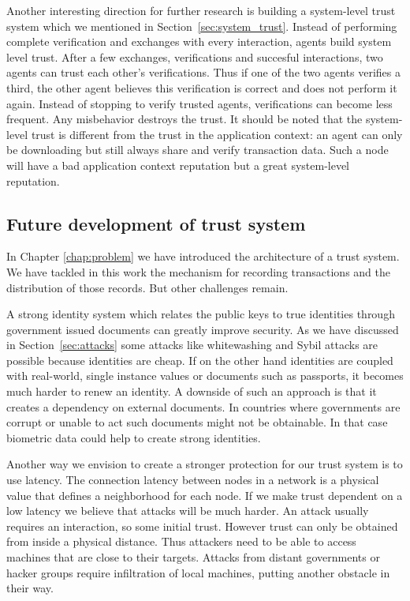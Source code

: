 Another interesting direction for further research is building a system-level trust system which we
mentioned in Section~\ref{sec:system_trust}. Instead of performing complete verification and exchanges
with every interaction, agents build system level trust. After a few exchanges, verifications and 
succesful interactions, two agents can trust each other's verifications. Thus if one of the two 
agents verifies a third, the other agent believes this verification is correct and does not perform
it again. Instead of stopping to verify trusted agents, verifications can become less frequent. Any 
misbehavior destroys the trust. It should be noted that the system-level trust is different from the
trust in the application context: an agent can only be downloading but still always share and verify
transaction data. Such a node will have a bad application context reputation but a great system-level
reputation.

\subsection{Future development of trust system}
In Chapter \ref{chap:problem} we have introduced the architecture of a trust system. We have tackled
in this work the mechanism for recording transactions and the distribution of those records. But
other challenges remain. 

A strong identity system which relates the public keys to true identities through government issued
documents can greatly improve security. As we have discussed in Section~\ref{sec:attacks} some 
attacks like whitewashing and Sybil attacks are possible because identities are cheap. If on the 
other hand identities are coupled with real-world, single instance values or documents such as 
passports, it becomes much harder to renew an identity. A downside of such an approach is that 
it creates a dependency on external documents. In countries where governments are corrupt or 
unable to act such documents might not be obtainable. In that case biometric data could help to 
create strong identities. 

Another way we envision to create a stronger protection for our trust system is to use latency. The 
connection latency between nodes in a network is a physical value that defines a neighborhood for  
each node. If we make trust dependent on a low latency we believe that attacks will be much harder.
An attack usually requires an interaction, so some initial trust. However trust can only be obtained
from inside a physical distance. Thus attackers need to be able to access machines that are close
to their targets. Attacks from distant governments or hacker groups require infiltration of local
machines, putting another obstacle in their way.

